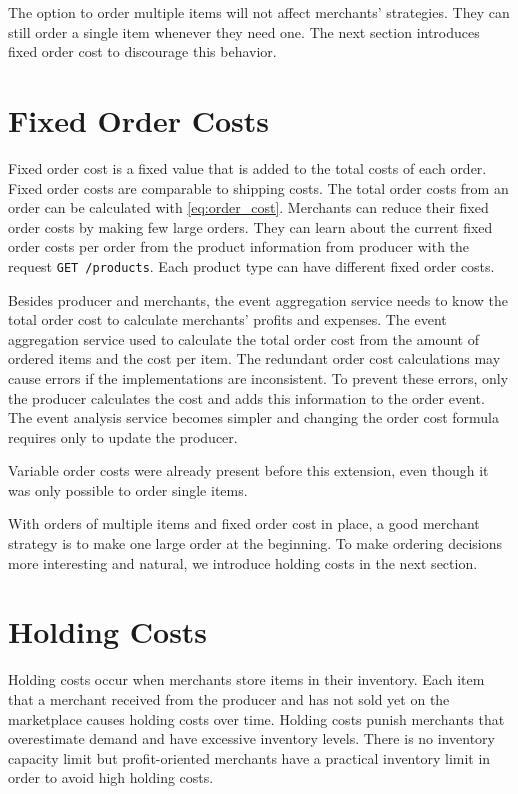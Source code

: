 The option to order multiple items will not affect merchants' strategies.
They can still order a single item whenever they need one.
The next section introduces fixed order cost to discourage this behavior.

\section{Fixed Order Costs}
\label{section:fixed_order_cost}
Fixed order cost is a fixed value that is added to the total costs of each order.
Fixed order costs are comparable to shipping costs.
The total order costs from an order can be calculated with \cref{eq:order_cost}.
Merchants can reduce their fixed order costs by making few large orders.
They can learn about the current fixed order costs per order from the product information from producer with the request \texttt{GET /products}.
Each product type can have different fixed order costs.

Besides producer and merchants, the event aggregation service needs to know the total order cost to calculate merchants' profits and expenses.
The event aggregation service used to calculate the total order cost from the amount of ordered items and the cost per item.
The redundant order cost calculations may cause errors if the implementations are inconsistent.
To prevent these errors, only the producer calculates the cost and adds this information to the order event.
The event analysis service becomes simpler and changing the order cost formula requires only to update the producer.

Variable order costs were already present before this extension, even though it was only possible to order single items.

With orders of multiple items and fixed order cost in place, a good merchant strategy is to make one large order at the beginning.
To make ordering decisions more interesting and natural, we introduce holding costs in the next section.

\section{Holding Costs}
\label{section:holding_cost}
Holding costs occur when merchants store items in their inventory.
Each item that a merchant received from the producer and has not sold yet on the marketplace causes holding costs over time.
Holding costs punish merchants that overestimate demand and have excessive inventory levels.
There is no inventory capacity limit but profit-oriented merchants have a practical inventory limit in order to avoid high holding costs.

